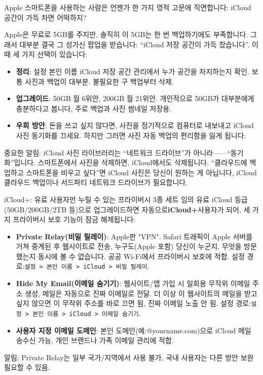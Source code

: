 
Apple 스마트폰을 사용하는 사람은 언젠가 한 가지 영적 고문에 직면합니다: iCloud 공간이 가득 차면 어떡하지?

Apple은 무료로 5GB를 주지만, 솔직히 이 5GB는 한 번 백업하기에도 부족합니다. 그래서 대부분 결국 그 성가신 팝업을 받습니다: “iCloud 저장 공간이 가득 찼습니다”. 이때 세 가지 선택이 있습니다:

\begin{itemize}
  \item \textbf{정리}: 설정 본인 이름 iCloud 저장 공간 관리에서 누가 공간을 차지하는지 확인. 보통 사진과 백업이 대부분. 불필요한 구 백업부터 삭제.
  \item \textbf{업그레이드}: 50GB 월 6위안, 200GB 월 21위안. 개인적으로 50GB가 대부분에게 충분하다고 봅니다, 주로 백업과 사진 썸네일 저장용.
  \item \textbf{우회 방안}: 돈을 쓰고 싶지 않다면, 사진을 정기적으로 컴퓨터로 내보내고 iCloud 사진 동기화를 끄세요. 하지만 그러면 사진 자동 백업의 편리함을 잃게 됩니다.
\end{itemize}

중요한 알림: iCloud 사진 라이브러리는 “네트워크 드라이브”가 아니라——“동기화”입니다. 스마트폰에서 사진을 삭제하면, iCloud에서도 삭제됩니다. “클라우드에 백업하고 스마트폰을 비우고 싶다”면 iCloud 사진은 당신이 원하는 게 아닙니다, iCloud 클라우드 백업이나 서드파티 네트워크 드라이브가 필요합니다.

\begin{tcbinfo}{iCloud+: 유료 사용자만 누릴 수 있는 프라이버시 3종 세트}
임의 유료 iCloud 등급(50GB/200GB/2TB 등)으로 업그레이드하면 자동으로\textbf{iCloud+}사용자가 되어, 세 가지 프라이버시 보호 기능이 잠금 해제됩니다:

\begin{itemize}
  \item \textbf{Private Relay(비밀 릴레이)}: Apple판 "VPN". Safari 트래픽이 Apple 서버를 거쳐 중계된 후 웹사이트로 전송, 누구도(Apple 포함) 당신이 누군지, 무엇을 방문했는지 동시에 볼 수 없습니다. 공공 Wi-Fi에서 프라이버시 보호에 적합. 설정 경로:\texttt{설정 > 본인 이름 > iCloud > 비밀 릴레이}.
  \item \textbf{Hide My Email(이메일 숨기기)}: 웹사이트/앱 가입 시 일회용 무작위 이메일 주소 생성, 메일은 자동으로 진짜 이메일로 전달. 더 이상 이 웹사이트의 메일을 받고 싶지 않으면 이 무작위 주소를 바로 끄면 됨, 진짜 이메일 노출 안 됨. 설정 경로:\texttt{설정 > 본인 이름 > iCloud > 이메일 숨기기}.
  \item \textbf{사용자 지정 이메일 도메인}: 본인 도메인(예:@yourname.com)으로 iCloud 메일 송수신 가능, 개인 브랜드나 가족 이메일 관리에 적합.
\end{itemize}

알림: Private Relay는 일부 국가/지역에서 사용 불가, 국내 사용자는 다른 방안 보완 필요할 수 있음.

\end{tcbinfo}

